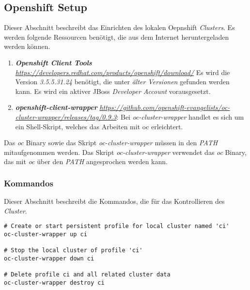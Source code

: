 \subsection{Openshift Setup}
Dieser Abschnitt beschreibt das Einrichten des lokalen Oepnshift \emph{Clusters}.
\newline
\newline
Es werden folgende Ressourcen benötigt, die aus dem Internet heruntergeladen werden können.
\begin{enumerate}
	\item\textbf{\emph{Openshift Client Tools}}
	\newline
	\emph{\url{https://developers.redhat.com/products/openshift/download/}}
	\newline
	Es wird die Version \emph{3.5.5.31.24} benötigt, die unter \emph{älter Versionen} gefunden werden kann.
	\newline
	Es wird ein aktiver JBoss \emph{Developer Account} vorausgesetzt.
	\item\textbf{\emph{openshift-client-wrapper}}
	\newline
	\emph{\url{https://github.com/openshift-evangelists/oc-cluster-wrapper/releases/tag/0.9.3}}:
	\newline
	Bei \emph{oc-cluster-wrapper} handlet es sich um ein Shell-Skript, welches das Arbeiten mit oc erleichtert.
\end{enumerate}
Das \emph{oc} Binary sowie das Skript \emph{oc-cluster-wrapper} müssen in den \emph{PATH} mitaufgenommen werden. Das Skript \emph{oc-cluster-wrapper} verwendet das \emph{oc} Binary, das mit \emph{oc} über den \emph{PATH} angesprochen werden kann.

\subsubsection{Kommandos}
Dieser Abschnitt beschreibt die Kommandos, die für das Kontrollieren des \emph{Cluster}.
\begin{verbatim}
# Create or start persistent profile for local cluster named 'ci'
oc-cluster-wrapper up ci

# Stop the local cluster of profile 'ci'
oc-cluster-wrapper down ci

# Delete profile ci and all related cluster data
oc-cluster-wrapper destroy ci
\end{verbatim}
\ \newpage

